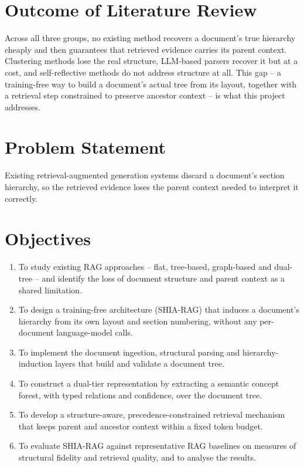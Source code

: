 \documentclass[12pt, a4paper, openright, twoside]{report}
\begin{document}
\section{Outcome of Literature Review}
Across all three groups, no existing method recovers a document's true hierarchy cheaply and then guarantees that retrieved evidence carries its parent context. Clustering methods lose the real structure, LLM-based parsers recover it but at a cost, and self-reflective methods do not address structure at all. This gap -- a training-free way to build a document's actual tree from its layout, together with a retrieval step constrained to preserve ancestor context -- is what this project addresses.

\section{Problem Statement}
Existing retrieval-augmented generation systems discard a document's section hierarchy, so the retrieved evidence loses the parent context needed to interpret it correctly.

\section{Objectives}
\begin{enumerate}
    \item To study existing RAG approaches -- flat, tree-based, graph-based and dual-tree -- and identify the loss of document structure and parent context as a shared limitation.
    \item To design a training-free architecture (SHIA-RAG) that induces a document's hierarchy from its own layout and section numbering, without any per-document language-model calls.
    \item To implement the document ingestion, structural parsing and hierarchy-induction layers that build and validate a document tree.
    \item To construct a dual-tier representation by extracting a semantic concept forest, with typed relations and confidence, over the document tree.
    \item To develop a structure-aware, precedence-constrained retrieval mechanism that keeps parent and ancestor context within a fixed token budget.
    \item To evaluate SHIA-RAG against representative RAG baselines on measures of structural fidelity and retrieval quality, and to analyse the results.
\end{enumerate}
\end{document}
